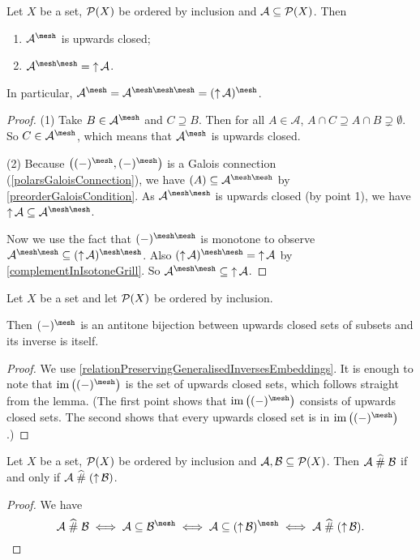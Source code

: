 \begin{lemma} \label{upwardClosureGrill}
Let $X$ be a set, $\operatorname{\mathcal{P}}(X)$ be ordered by inclusion and $\mathcal{A} \subseteq \operatorname{\mathcal{P}}(X)$. Then
\begin{enumerate}
\item $\mathcal{A}^\mesh$ is upwards closed;
\item $\mathcal{A}^{\mesh\mesh} = \upset\mathcal{A}$.
\end{enumerate}
In particular, $\mathcal{A}^\mesh = \mathcal{A}^{\mesh\mesh\mesh} = (\upset\mathcal{A})^\mesh$.
\end{lemma}
\begin{proof}
(1) Take $B\in \mathcal{A}^\mesh$ and $C\supseteq B$. Then for all $A\in\mathcal{A}$, $A\cap C \supseteq A\cap B \supsetneq \emptyset$. So $C\in \mathcal{A}^\mesh$, which means that $\mathcal{A}^\mesh$ is upwards closed.

(2) Because $\big((-)^\mesh, (-)^\mesh\big)$ is a Galois connection (\ref{polarsGaloisConnection}), we have $\mathcal(A) \subseteq \mathcal{A}^{\mesh\mesh}$ by \ref{preorderGaloisCondition}. As $\mathcal{A}^{\mesh\mesh}$ is upwards closed (by point 1), we have $\upset \mathcal{A} \subseteq \mathcal{A}^{\mesh\mesh}$.

Now we use the fact that $(-)^{\mesh\mesh}$ is monotone to observe $\mathcal{A}^{\mesh\mesh} \subseteq (\upset\mathcal{A})^{\mesh\mesh}$. Also $(\upset\mathcal{A})^{\mesh\mesh} = \upset \mathcal{A}$ by
\ref{complementInIsotoneGrill}. So $\mathcal{A}^{\mesh\mesh} \subseteq \upset\mathcal{A}$.
\end{proof}
\begin{corollary} \label{grillUpsetOrderSimilarity}
Let $X$ be a set and let $\operatorname{\mathcal{P}}(X)$ be ordered by inclusion.

Then $(-)^\mesh$ is an antitone bijection between upwards closed sets of subsets and its inverse is itself.
\end{corollary}
\begin{proof}
We use \ref{relationPreservingGeneralisedInversesEmbeddings}. It is enough to note that $\im\big((-)^\mesh\big)$ is the set of upwards closed sets, which follows straight from the lemma. (The first point shows that $\im\big((-)^\mesh\big)$ consists of upwards closed sets. The second shows that every upwards closed set is in $\im\big((-)^\mesh\big)$.)
\end{proof}
\begin{corollary} \label{ameshUpwardClosure}
Let $X$ be a set, $\operatorname{\mathcal{P}}(X)$ be ordered by inclusion and $\mathcal{A}, \mathcal{B} \subseteq \operatorname{\mathcal{P}}(X)$. Then $\mathcal{A} \mathrel{\widehat{\#}} \mathcal{B}$ \textup{if and only if} $\mathcal{A} \mathrel{\widehat{\#}} (\operatorname{\uparrow}\mathcal{B})$.
\end{corollary}
\begin{proof}
We have
\[ \mathcal{A}\amesh \mathcal{B} \iff \mathcal{A}\subseteq \mathcal{B}^\mesh \iff \mathcal{A}\subseteq (\upset\mathcal{B})^\mesh \iff \mathcal{A}\amesh (\upset\mathcal{B}). \]
\end{proof}

